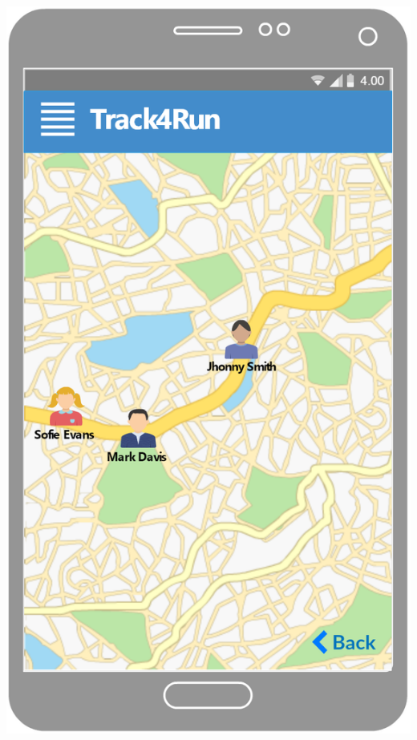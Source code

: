 \begin{center}
\begin{minipage}[c]{.40\textwidth}
\includegraphics[width=1\textwidth]{Images/userInterface/Race}
\end{minipage}
\end{center}


